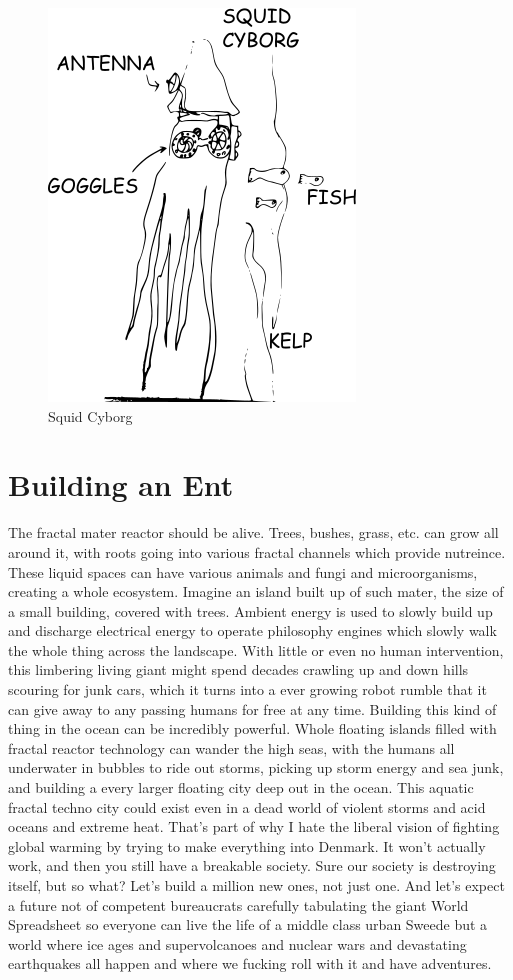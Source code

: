 \begin{figure}[htbp]
\centering
\includegraphics{images/squidcyborg.png}
\caption{Squid Cyborg}
\end{figure}

\section{Building an Ent}\label{building-an-ent}

The fractal mater reactor should be alive. Trees, bushes, grass, etc.
can grow all around it, with roots going into various fractal channels
which provide nutreince. These liquid spaces can have various animals
and fungi and microorganisms, creating a whole ecosystem. Imagine an
island built up of such mater, the size of a small building, covered
with trees. Ambient energy is used to slowly build up and discharge
electrical energy to operate philosophy engines which slowly walk the
whole thing across the landscape. With little or even no human
intervention, this limbering living giant might spend decades crawling
up and down hills scouring for junk cars, which it turns into a ever
growing robot rumble that it can give away to any passing humans for
free at any time. Building this kind of thing in the ocean can be
incredibly powerful. Whole floating islands filled with fractal reactor
technology can wander the high seas, with the humans all underwater in
bubbles to ride out storms, picking up storm energy and sea junk, and
building a every larger floating city deep out in the ocean. This
aquatic fractal techno city could exist even in a dead world of violent
storms and acid oceans and extreme heat. That's part of why I hate the
liberal vision of fighting global warming by trying to make everything
into Denmark. It won't actually work, and then you still have a
breakable society. Sure our society is destroying itself, but so what?
Let's build a million new ones, not just one. And let's expect a future
not of competent bureaucrats carefully tabulating the giant World
Spreadsheet so everyone can live the life of a middle class urban Sweede
but a world where ice ages and supervolcanoes and nuclear wars and
devastating earthquakes all happen and where we fucking roll with it and
have adventures.

